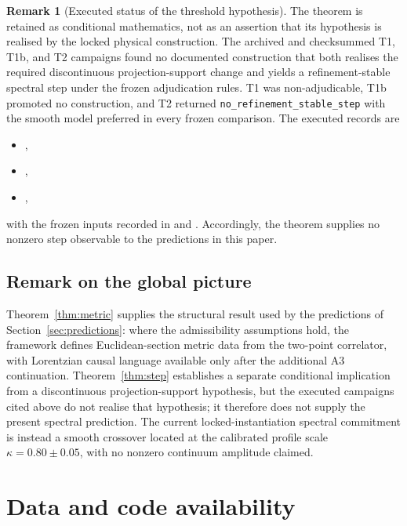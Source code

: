 ﻿\documentclass[12pt,a4paper]{article}
\theoremstyle{definition}
\newtheorem{remark}[theorem]{Remark}
\begin{document}
\begin{remark}[Executed status of the threshold hypothesis]
The theorem is retained as conditional mathematics, not as an assertion that its hypothesis is realised by the locked physical construction. The archived and checksummed T1, T1b, and T2 campaigns found no documented construction that both realises the required discontinuous projection-support change and yields a refinement-stable spectral step under the frozen adjudication rules. T1 was non-adjudicable, T1b promoted no construction, and T2 returned \texttt{no\_refinement\_stable\_step} with the smooth model preferred in every frozen comparison. The executed records are
\begin{itemize}
  \item {},
  \item {},
  \item {},
\end{itemize}
with the frozen inputs recorded in  and
. Accordingly, the theorem supplies no nonzero step observable to the predictions in this paper.
\end{remark}

\subsection{Remark on the global picture}

Theorem~\ref{thm:metric} supplies the structural result used by the predictions of Section~\ref{sec:predictions}: where the admissibility assumptions hold, the framework defines Euclidean-section metric data from the two-point correlator, with Lorentzian causal language available only after the additional A3 continuation. Theorem~\ref{thm:step} establishes a separate conditional implication from a discontinuous projection-support hypothesis, but the executed campaigns cited above do not realise that hypothesis; it therefore does not supply the present spectral prediction. The current locked-instantiation spectral commitment is instead a smooth crossover located at the calibrated profile scale $\kappa = 0.80 \pm 0.05$, with no nonzero continuum amplitude claimed.

\section*{Data and code availability}
\end{document}
